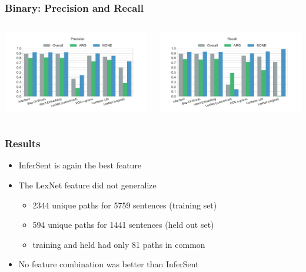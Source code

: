 \documentclass[11pt,aspectratio=169,usenames,dvipsnames]{beamer}
\begin{document}
    \begin{frame}[t]
        \frametitle{Binary: Precision and Recall}
        \begin{columns}[t]
            \column{2in}
            \centerline{\includegraphics[scale=0.31,trim={2cm 0 0 0},clip]{images/experiments/hp-precision-True}}
            \column{2in}
            \centerline{\includegraphics[scale=0.31,trim={0 0 2cm 0},clip]{images/experiments/hp-recall-True}}

        \end{columns}
    \end{frame}

    \begin{frame}[t]
        \frametitle{Results}
        \begin{itemize}
            \item InferSent is again the best feature
            \item The LexNet feature did not generalize\pause
            \begin{itemize}
                \item 2344 unique paths for 5759 sentences (training set)
                \item 594 unique paths for 1441 sentences (held out set)
                \item training and held had only 81 paths in common
            \end{itemize}
            \item No feature combination was better than InferSent
        \end{itemize}
    \end{frame}
\end{document}

